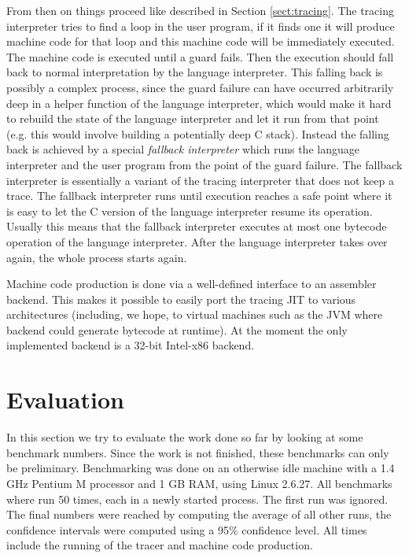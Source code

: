 \documentclass{sig-alternate}
\begin{document}
From then on things proceed like described in Section \ref{sect:tracing}. The
tracing interpreter tries to find a loop in the user program, if it finds one it
will produce machine code for that loop and this machine code will be
immediately executed. The machine code is executed until a guard fails. Then the
execution should fall back to normal interpretation by the language interpreter.
This falling back is possibly a complex process, since the guard failure can
have occurred arbitrarily deep in a helper function of the language interpreter,
which would make it hard to rebuild the state of the language interpreter and
let it run from that point (e.g. this would involve building a potentially deep
C stack). Instead the falling back is achieved by a special \emph{fallback
interpreter} which runs the language interpreter and the user program from the
point of the guard failure. The fallback interpreter is essentially a variant of
the tracing interpreter that does not keep a trace. The fallback interpreter
runs until execution reaches a safe point where it is easy to let the C version
of the language interpreter resume its operation. Usually this means that the
fallback interpreter executes at most one bytecode operation of the language
interpreter. After the language interpreter takes over again, the whole process
starts again.

Machine code production is done via a well-defined interface to an assembler
backend. This makes it possible to easily port the tracing JIT to various
architectures (including, we hope, to virtual machines such as the JVM where
backend could generate bytecode at runtime). At the moment the only implemented
backend is a 32-bit Intel-x86 backend.


\section{Evaluation}
\label{sect:evaluation}

In this section we try to evaluate the work done so far by looking at some
benchmark numbers. Since the work is not finished, these benchmarks can only be
preliminary. Benchmarking was done on an otherwise idle machine with a 1.4
GHz Pentium M processor and 1 GB RAM, using Linux 2.6.27. All benchmarks where
run 50 times, each in a newly started process. The first run was ignored. The
final numbers were reached by computing the average of all other runs, the
confidence intervals were computed using a 95\% confidence level. All times
include the running of the tracer and machine code production.
\end{document}
